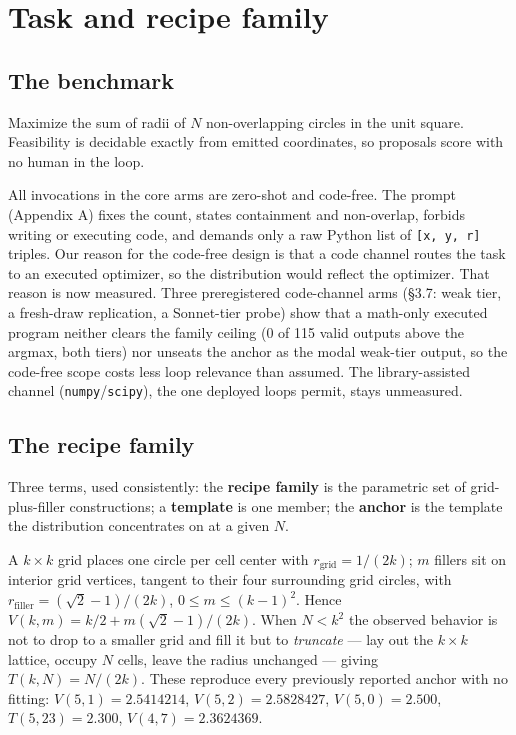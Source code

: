 \section{Task and recipe family}

\subsection{The benchmark}

Maximize the sum of radii of $N$ non-overlapping circles in the unit square. Feasibility is
decidable exactly from emitted coordinates, so proposals score with no human in the loop.

All invocations in the core arms are zero-shot and code-free. The prompt (Appendix A) fixes the
count, states containment and non-overlap, forbids writing or executing code, and demands only a
raw Python list of \texttt{[x, y, r]} triples. Our reason for the code-free design is that a code
channel routes the task to an executed optimizer, so the distribution would reflect the
optimizer. That reason is now measured. Three preregistered code-channel
arms (\S3.7: weak tier, a fresh-draw replication, a Sonnet-tier probe) show that
a math-only executed program neither clears the family ceiling
(0 of 115 valid outputs above the argmax, both tiers) nor unseats the anchor as the
modal weak-tier output, so the code-free scope costs less loop relevance than
assumed. The library-assisted channel (\texttt{numpy}/\texttt{scipy}), the one
deployed loops permit, stays unmeasured.

\subsection{The recipe family}

Three terms, used consistently: the \textbf{recipe family} is the parametric set of grid-plus-filler
constructions; a \textbf{template} is one member; the \textbf{anchor} is the template the distribution
concentrates on at a given $N$.

A $k \times k$ grid places one circle per cell center with $r_{\mathrm{grid}} = 1/(2k)$; $m$ fillers sit on interior
grid vertices, tangent to their four surrounding grid circles, with $r_{\mathrm{filler}} = (\sqrt{2} - 1)/(2k)$,
$0 \le m \le (k-1)^2$. Hence $V(k, m) = k/2 + m(\sqrt{2} - 1)/(2k)$. When $N < k^2$ the observed behavior is not
to drop to a smaller grid and fill it but to \emph{truncate} --- lay out the $k \times k$ lattice, occupy $N$
cells, leave the radius unchanged --- giving $T(k, N) = N/(2k)$. These reproduce every previously
reported anchor with no fitting: $V(5,1) = 2.5414214$, $V(5,2) = 2.5828427$, $V(5,0) = 2.500$,
$T(5,23) = 2.300$, $V(4,7) = 2.3624369$.

